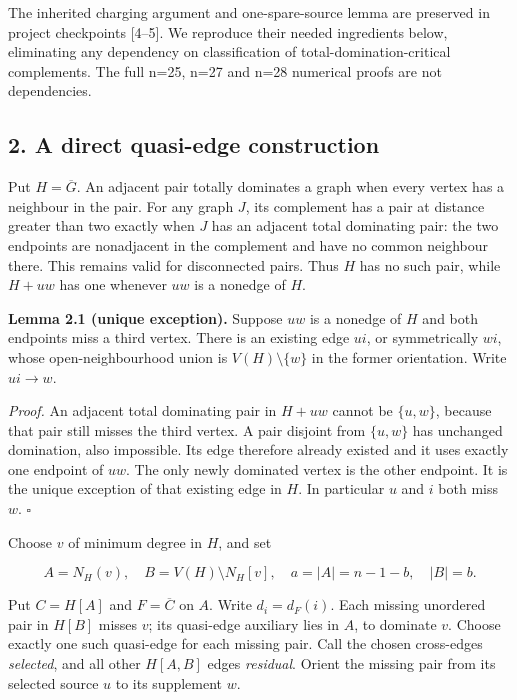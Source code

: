 \documentclass[
  11pt,
  a4paper,
]{article}
\begin{document}
The inherited charging argument and one-spare-source lemma are preserved
in project checkpoints {[}4--5{]}. We reproduce their needed ingredients
below, eliminating any dependency on classification of
total-domination-critical complements. The full n=25, n=27 and n=28
numerical proofs are not dependencies.

\subsection{2. A direct quasi-edge
construction}\label{a-direct-quasi-edge-construction}

Put \(H=\overline G\). An adjacent pair totally dominates a graph when
every vertex has a neighbour in the pair. For any graph \(J\), its
complement has a pair at distance greater than two exactly when \(J\)
has an adjacent total dominating pair: the two endpoints are nonadjacent
in the complement and have no common neighbour there. This remains valid
for disconnected pairs. Thus \(H\) has no such pair, while \(H+uw\) has
one whenever \(uw\) is a nonedge of \(H\).

\textbf{Lemma 2.1 (unique exception).} Suppose \(uw\) is a nonedge of
\(H\) and both endpoints miss a third vertex. There is an existing edge
\(ui\), or symmetrically \(wi\), whose open-neighbourhood union is
\(V(H)\setminus\{w\}\) in the former orientation. Write \(ui\to w\).

\emph{Proof.} An adjacent total dominating pair in \(H+uw\) cannot be
\(\{u,w\}\), because that pair still misses the third vertex. A pair
disjoint from \(\{u,w\}\) has unchanged domination, also impossible. Its
edge therefore already existed and it uses exactly one endpoint of
\(uw\). The only newly dominated vertex is the other endpoint. It is the
unique exception of that existing edge in \(H\). In particular \(u\) and
\(i\) both miss \(w\). \(\square\)

Choose \(v\) of minimum degree in \(H\), and set

\[A=N_H(v),\quad B=V(H)\setminus N_H[v],\quad a=|A|=n-1-b,\quad |B|=b.\]

Put \(C=H[A]\) and \(F=\overline C\) on \(A\). Write \(d_i=d_F(i)\).
Each missing unordered pair in \(H[B]\) misses \(v\); its quasi-edge
auxiliary lies in \(A\), to dominate \(v\). Choose exactly one such
quasi-edge for each missing pair. Call the chosen cross-edges
\emph{selected}, and all other \(H[A,B]\) edges \emph{residual}. Orient
the missing pair from its selected source \(u\) to its supplement \(w\).
\end{document}

